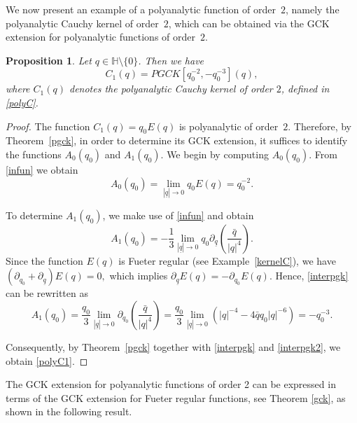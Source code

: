 \documentclass[reqno,11pt]{amsart}
\numberwithin{equation}{section}
\newtheorem{proposition}[theorem]{Proposition}
\theoremstyle{definition}
\begin{document}
We now present an example of a polyanalytic function of order~$2$, namely the polyanalytic Cauchy kernel of order~$2$, which can be obtained via the GCK extension for polyanalytic functions of order~$2$.
\begin{proposition}
Let $q \in \mathbb{H} \setminus \{0\}$. Then we have
\begin{equation}
\label{polyC1}
 C_1(q)= PGCK[q_0^{-2},-q_0^{-3}](q),
\end{equation}
where $C_1(q)$ denotes the polyanalytic Cauchy kernel of order $2$, defined in \eqref{polyC}.
\end{proposition}
\begin{proof}
The function $C_1(q)=q_0E(q)$ is polyanalytic of order~$2$. Therefore, by Theorem~\ref{pgck}, in order to determine its GCK extension, it suffices to identify the functions $A_0(q_0)$ and $A_1(q_0)$. We begin by computing $A_0(q_0)$. From \eqref{infun} we obtain
$$
A_0(q_0)= \lim_{|\underline{q}| \to 0} q_0 E(q)= q_0^{-2}.
$$

To determine $A_1(q_0)$, we make use of \eqref{infun} and obtain
\begin{equation}
	\label{interpgk}
	A_1(q_0)=-\frac{1}{3} \lim_{|\underline{q}| \to 0} q_0 \partial_{\underline{q}} \left(\frac{\bar{q}}{|q|^4}\right).
\end{equation}
Since the function $E(q)$ is Fueter regular (see Example~\ref{kernelC}), we have
$
(\partial_{q_0}+\partial_{\underline{q}})E(q)=0,
$
which implies $\partial_{\underline{q}}E(q)=-\partial_{q_0}E(q)$. Hence, \eqref{interpgk} can be rewritten as
\begin{equation} \label{interpgk2} A_1(q_0)= \frac{q_0}{3} \lim_{|\underline{q}| \to 0} \partial_{q_0} \left(\frac{\bar{q}}{|q|^4}\right)=\frac{q_0}{3} \lim_{|\underline{q}| \to 0}  \left(|q|^{-4}-4\bar{q}q_0|q|^{-6}\right)=-q_0^{-3}.
\end{equation}

Consequently, by Theorem~\ref{pgck} together with \eqref{interpgk} and \eqref{interpgk2}, we obtain \eqref{polyC1}.

\end{proof}





The GCK extension for polyanalytic functions of order 2 can be expressed in terms of the GCK extension for Fueter regular functions, see Theorem \ref{gck}, as shown in the following result.
\end{document}
